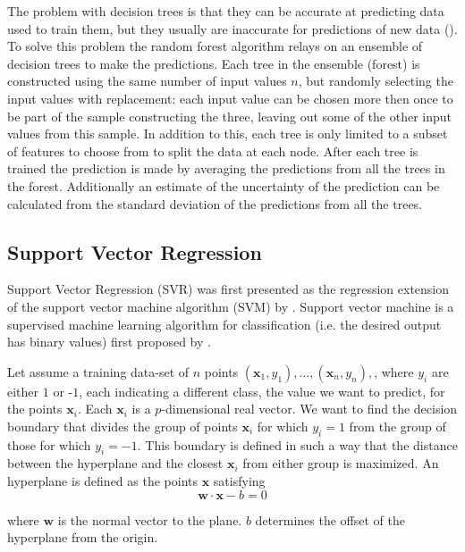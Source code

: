 The problem with decision trees is that they can be accurate at predicting data used to train them, but they usually are inaccurate for predictions of new data (\cite{hastie01statisticallearning}).
To solve this problem the random forest algorithm relays on an ensemble of decision trees to make the predictions. Each tree in the ensemble (forest) is constructed using the same number of input values $n$, but randomly selecting the input values with replacement: each input value can be chosen more then once to be part of the sample constructing the three, leaving out some of the other input values from this sample. In addition to this, each tree is only limited to a subset of features to choose from to split the data at each node. After each tree is trained the prediction is made by averaging the predictions from all the trees in the forest. Additionally an estimate of the uncertainty of the prediction can be calculated from the standard deviation of the predictions from all the trees.



\subsection{Support Vector Regression}\label{support-vector}
Support Vector Regression (SVR) was first presented as the regression extension of the support vector machine algorithm (SVM) by \citet{SVR1997}. Support vector machine is a supervised machine learning algorithm for classification (i.e. the desired output has binary values) first proposed by \citet{SVM1964}.

Let assume a training data-set of $n$ points ${({\mathbf {x}}_{1},y_{1}),\ldots ,({\mathbf {x}}_{n},y_{n}),}$, where $y_{i}$ are either $1$ or -$1$, each indicating a different class, the value we want to predict, for the points ${\mathbf {x}}_{i}$. Each ${\mathbf {x}_{i}}$ is a $p$-dimensional real vector. We want to find the decision boundary that divides the group of points $\mathbf {x}_{i}$ for which $y_{i}=1$ from the group of those for which $y_{i}=-1$. This boundary is defined in such a way that the distance between the hyperplane and the closest ${\mathbf {x}}_{i}$ from either group is maximized.
An hyperplane is defined as the points ${\mathbf {x}}$ satisfying 
\begin{equation}\label{eq:svm}
\mathbf {w}\cdot \mathbf {x}-b=0
\end{equation}

where $\mathbf {w}$ is the normal vector to the plane. $b$ determines the offset of the hyperplane from the origin.


